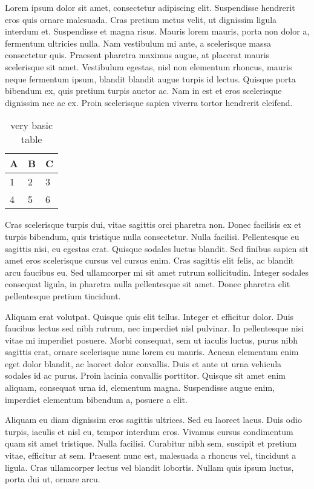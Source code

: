 Lorem ipsum dolor sit amet, consectetur adipiscing elit. Suspendisse hendrerit eros quis ornare malesuada. Cras pretium metus velit, ut dignissim ligula interdum et. Suspendisse et magna risus. Mauris lorem mauris, porta non dolor a, fermentum ultricies nulla. Nam vestibulum mi ante, a scelerisque massa consectetur quis. Praesent pharetra maximus augue, at placerat mauris scelerisque sit amet. Vestibulum egestas, nisl non elementum rhoncus, mauris neque fermentum ipsum, blandit blandit augue turpis id lectus. Quisque porta bibendum ex, quis pretium turpis auctor ac. Nam in est et eros scelerisque dignissim nec ac ex. Proin scelerisque sapien viverra tortor hendrerit eleifend.
\begin{table}[]
    \centering
    \begin{tabular}{l |l |l }
    A & B & C \\
    \hline
    1 & 2 & 3\\
    4 & 5 & 6
    \end{tabular}
    \caption{very basic table}
    \label{tab:abc}
\end{table}
Cras scelerisque turpis dui, vitae sagittis orci pharetra non. Donec facilisis ex et turpis bibendum, quis tristique nulla consectetur. Nulla facilisi. Pellentesque eu sagittis nisi, eu egestas erat. Quisque sodales luctus blandit. Sed finibus sapien sit amet eros scelerisque cursus vel cursus enim. Cras sagittis elit felis, ac blandit arcu faucibus eu. Sed ullamcorper mi sit amet rutrum sollicitudin. Integer sodales consequat ligula, in pharetra nulla pellentesque sit amet. Donec pharetra elit pellentesque pretium tincidunt.

Aliquam erat volutpat. Quisque quis elit tellus. Integer et efficitur dolor. Duis faucibus lectus sed nibh rutrum, nec imperdiet nisl pulvinar. In pellentesque nisi vitae mi imperdiet posuere. Morbi consequat, sem ut iaculis luctus, purus nibh sagittis erat, ornare scelerisque nunc lorem eu mauris. Aenean elementum enim eget dolor blandit, ac laoreet dolor convallis. Duis et ante ut urna vehicula sodales id ac purus. Proin lacinia convallis porttitor. Quisque sit amet enim aliquam, consequat urna id, elementum magna. Suspendisse augue enim, imperdiet elementum bibendum a, posuere a elit.

Aliquam eu diam dignissim eros sagittis ultrices. Sed eu laoreet lacus. Duis odio turpis, iaculis et nisl eu, tempor interdum eros. Vivamus cursus condimentum quam sit amet tristique. Nulla facilisi. Curabitur nibh sem, suscipit et pretium vitae, efficitur at sem. Praesent nunc est, malesuada a rhoncus vel, tincidunt a ligula. Cras ullamcorper lectus vel blandit lobortis. Nullam quis ipsum luctus, porta dui ut, ornare arcu.

